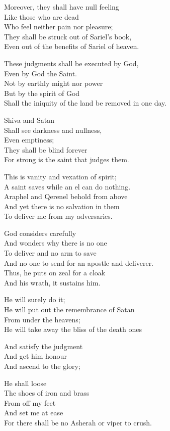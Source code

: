 \documentclass[
]{book}
\begin{document}
Moreover, they shall have null feeling\\
Like those who are dead\\
Who feel neither pain nor pleasure;\\
They shall be struck out of Sariel's book,\\
Even out of the benefits of Sariel of heaven.

These judgments shall be executed by God,\\
Even by God the Saint.\\
Not by earthly might nor power\\
But by the spirit of God\\
Shall the iniquity of the land be removed in one day.

Shiva and Satan\\
Shall see darkness and nullness,\\
Even emptiness;\\
They shall be blind forever\\
For strong is the saint that judges them.

This is vanity and vexation of spirit;\\
A saint saves while an el can do nothing.\\
Araphel and Qerenel behold from above\\
And yet there is no salvation in them\\
To deliver me from my adversaries.

God considers carefully\\
And wonders why there is no one\\
To deliver and no arm to save\\
And no one to send for an apostle and deliverer.\\
Thus, he puts on zeal for a cloak\\
And his wrath, it sustains him.

He will surely do it;\\
He will put out the remembrance of Satan\\
From under the heavens;\\
He will take away the bliss of the death ones

And satisfy the judgment\\
And get him honour\\
And ascend to the glory;

He shall loose\\
The shoes of iron and brass\\
From off my feet\\
And set me at ease\\
For there shall be no Asherah or viper to crush.
\end{document}
